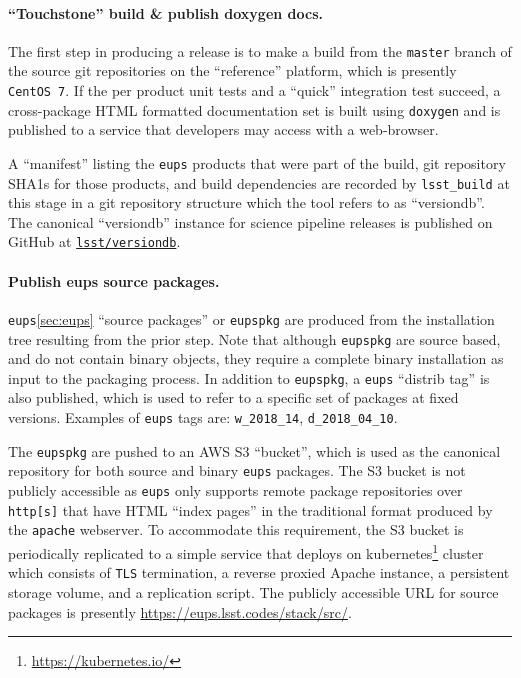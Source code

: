\paragraph{``Touchstone'' build \& publish doxygen docs.}

The first step in producing a release is to make a build from the
\texttt{master} branch of the source git repositories on the ``reference''
platform, which is presently \texttt{CentOS~7}.  If the per product unit tests
and a ``quick'' integration test succeed, a cross-package HTML
formatted documentation set is built using \texttt{doxygen}\cite{doxygen} and is published to
a service that developers may access with a web-browser.

A ``manifest'' listing the \texttt{eups} products that were part of the build,
git repository SHA1s for those products, and build dependencies are recorded by
\texttt{lsst\_build} at this stage in a git repository structure which the tool
refers to as ``versiondb''.  The canonical ``versiondb'' instance for science
pipeline releases is published on GitHub at
\href{https://github.com/lsst/versiondb}{\texttt{lsst/versiondb}}.

\paragraph{Publish eups source packages.}
\label{sec:scipipe-deploy-src}

\texttt{eups}\ref{sec:eups} ``source packages'' or \texttt{eupspkg} are
produced from the installation tree resulting from the prior step.  Note that
although \texttt{eupspkg} are source based, and do not contain binary objects,
they require a complete binary installation as input to the packaging process.
In addition to \texttt{eupspkg}, a \texttt{eups} ``distrib tag'' is also
published, which is used to refer to a specific set of packages at fixed
versions.  Examples of \texttt{eups} tags are: \texttt{w\_2018\_14}, \texttt{d\_2018\_04\_10}.

The \texttt{eupspkg} are pushed to an AWS S3 ``bucket'', which is used as the
canonical repository for both source and binary \texttt{eups} packages.  The S3
bucket is not publicly accessible as \texttt{eups} only supports remote
package repositories over \texttt{http[s]} that have HTML ``index
pages'' in the traditional format produced by the \texttt{apache}
webserver.  To accommodate this
requirement, the S3 bucket is periodically replicated to a simple
service that
deploys on kubernetes\footnote{\url{https://kubernetes.io/}} cluster which consists
of \texttt{TLS} termination, a reverse proxied Apache instance, a persistent
storage volume, and a replication script.  The publicly accessible URL for
source packages is presently \url{https://eups.lsst.codes/stack/src/}.

